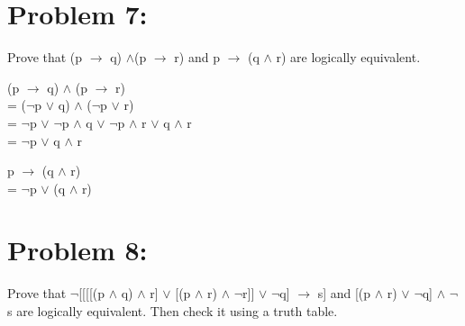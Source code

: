 \documentclass[12pt,en,a4paper]{article}
\begin{document}
	\section*{Problem 7:}
	Prove that (p $\rightarrow$ q) $\wedge $(p $\rightarrow$ r) and p $\rightarrow$ (q $\wedge$ r) are logically equivalent.
	
	(p $\rightarrow$ q) $\wedge$ (p $\rightarrow$ r)\\
	= ($\neg$p $\vee$ q) $\wedge$ ($\neg$p $\vee$ r)\\
	= $\neg$p $\vee$ $\neg$p $\wedge$ q $\vee$ $\neg$p $\wedge$ r $\vee$ q $\wedge$ r\\
	= $\neg$p $\vee$ q $\wedge$ r
	
	p $\rightarrow$ (q $\wedge$ r)\\
	= $\neg$p $\vee$ (q $\wedge$ r)\\
\newpage
{}
	\section*{Problem 8:}
	Prove that $\neg$[[[[(p $\wedge$ q) $\wedge$ r] $\vee$ [(p $\wedge$ r) $\wedge$ $\neg$r]] $\vee$ $\neg$q] $\rightarrow$ s] and [(p $\wedge$ r) $\vee$ $\neg$q] $\wedge$ $\neg$s are logically equivalent. Then check it using a truth table.
	
\end{document}
